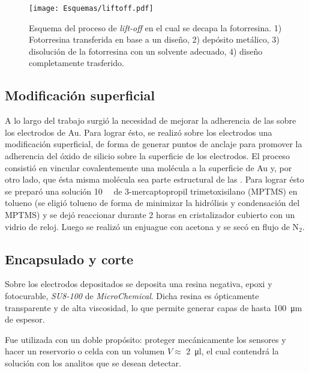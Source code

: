 		 	\begin{figure}[h!]
			  \begin{center}
			  \texttt{[image: Esquemas/liftoff.pdf]}
			  \caption[Esquema del proceso de\textit{ lift-off}]{Esquema del proceso de\textit{ lift-off} en el cual se decapa la fotorresina. 1) Fotorresina transferida en base a un diseño, 2) depósito metálico, 3) disolución de la fotorresina con un solvente adecuado, 4) diseño completamente trasferido.}
			  \label{esq:liftoff}
			  \end{center}
			  \end{figure}

	\vspace*{-4mm}\subsection{Modificación superficial}\label{sec:silanizacion}
		
		A lo largo del trabajo surgió la necesidad de mejorar la adherencia de las \pdm\space sobre los electrodos de Au. Para lograr ésto, se realizó sobre los electrodos una modificación superficial, de forma de generar puntos de anclaje para promover la adherencia del óxido de silicio sobre la superficie de los electrodos.
		El proceso consistió en vincular covalentemente una molécula a la superficie de Au y, por otro lado, que ésta misma molécula sea parte estructural de las \pdm. Para lograr ésto se preparó una solución \SI{10}{\milli\Molar} de 3-mercaptopropil trimetoxisilano (MPTMS) en tolueno (se eligió tolueno de forma de minimizar la hidrólisis y condensación del MPTMS) y se dejó reaccionar durante 2 horas en cristalizador cubierto con un vidrio de reloj. \cite{Goss1991,Herzog2013} Luego se realizó un enjuague con acetona y se secó en flujo de N$_2$.

	\subsection{Encapsulado y corte}\label{sec:corte}

		Sobre los electrodos depositados se deposita una resina negativa, epoxi y fotocurable, \textit{SU8-100} de \textit{MicroChemical}\cite{MicrochemicalsTeam2009}. Dicha resina es ópticamente transparente y de alta viscosidad, lo que permite generar capas de hasta \SI{100}{\um} de espesor. 

		Fue utilizada con un doble propósito: proteger mecánicamente los sensores y hacer un reservorio o celda con un volumen  $V \approx$ \SI{2}{\ul}, el cual contendrá la solución con los analitos que se desean detectar.  
			
